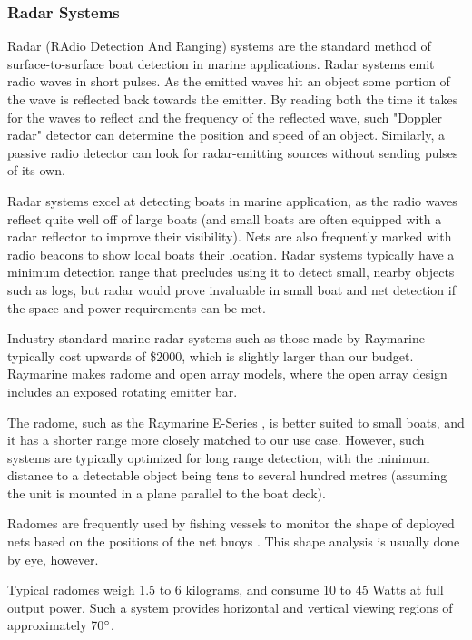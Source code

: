 \subsubsection{\label{sec:intro:technical-background:radar}Radar Systems}
Radar (RAdio Detection And Ranging) systems are the standard method of surface-to-surface boat detection in marine applications. Radar systems emit radio waves in short pulses. As the emitted waves hit an object some portion of the wave is reflected back towards the emitter. By reading both the time it takes for the waves to reflect and the frequency of the reflected wave,  such "Doppler radar" detector can determine the position and speed of an object. Similarly, a passive radio detector can look for radar-emitting sources without sending pulses of its own.

Radar systems excel at detecting boats in marine application, as the radio waves reflect quite well off of large boats (and small boats are often equipped with a radar reflector to improve their visibility). Nets are also frequently marked with radio beacons to show local boats their location. Radar systems typically have a minimum detection range that precludes using it to detect small, nearby objects such as logs, but radar would prove invaluable in small boat and net detection if the space and power requirements can be met.

Industry standard marine radar systems such as those made by Raymarine typically cost upwards of \$2000, which is slightly larger than our budget. Raymarine makes radome and open array models, where the open array design includes an exposed rotating emitter bar.

The radome, such as the Raymarine E-Series \cite{raymarine-eseries}, is better suited to small boats, and it has a shorter range more closely matched to our use case. However, such systems are typically optimized for long range detection, with the minimum distance to a detectable object being tens to several hundred metres (assuming the unit is mounted in a plane parallel to the boat deck).

Radomes are frequently used by fishing vessels to monitor the shape of deployed nets based on the positions of the net buoys \cite{furuno__marine-radar-guide}. This shape analysis is usually done by eye, however.

Typical radomes weigh 1.5 to 6 kilograms, and consume 10 to 45 Watts at full output power. Such a system provides horizontal and vertical viewing regions of approximately 70$\degree$.


